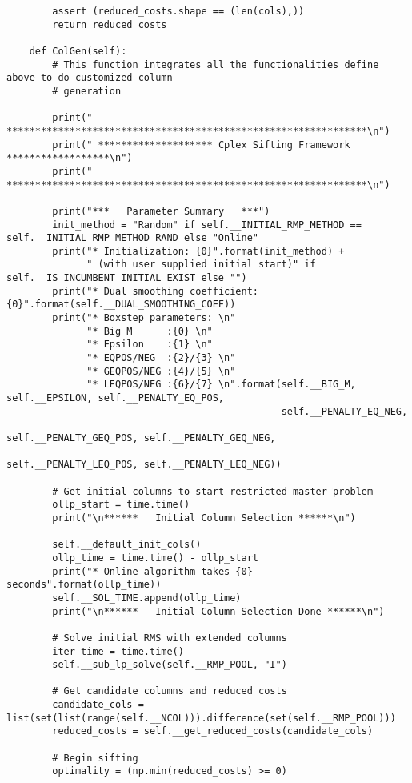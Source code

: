 \documentclass{article}
\begin{document}
\begin{lstlisting}
        assert (reduced_costs.shape == (len(cols),))
        return reduced_costs

    def ColGen(self):
        # This function integrates all the functionalities define above to do customized column 
        # generation

        print(" ***************************************************************\n")
        print(" ******************** Cplex Sifting Framework ******************\n")
        print(" ***************************************************************\n")

        print("***   Parameter Summary   ***")
        init_method = "Random" if self.__INITIAL_RMP_METHOD == self.__INITIAL_RMP_METHOD_RAND else "Online"
        print("* Initialization: {0}".format(init_method) +
              " (with user supplied initial start)" if self.__IS_INCUMBENT_INITIAL_EXIST else "")
        print("* Dual smoothing coefficient: {0}".format(self.__DUAL_SMOOTHING_COEF))
        print("* Boxstep parameters: \n"
              "* Big M      :{0} \n"
              "* Epsilon    :{1} \n"
              "* EQPOS/NEG  :{2}/{3} \n"
              "* GEQPOS/NEG :{4}/{5} \n"
              "* LEQPOS/NEG :{6}/{7} \n".format(self.__BIG_M, self.__EPSILON, self.__PENALTY_EQ_POS,
                                                self.__PENALTY_EQ_NEG, 
                                                self.__PENALTY_GEQ_POS, self.__PENALTY_GEQ_NEG,
                                                self.__PENALTY_LEQ_POS, self.__PENALTY_LEQ_NEG))

        # Get initial columns to start restricted master problem
        ollp_start = time.time()
        print("\n******   Initial Column Selection ******\n")

        self.__default_init_cols()
        ollp_time = time.time() - ollp_start
        print("* Online algorithm takes {0} seconds".format(ollp_time))
        self.__SOL_TIME.append(ollp_time)
        print("\n******   Initial Column Selection Done ******\n")

        # Solve initial RMS with extended columns
        iter_time = time.time()
        self.__sub_lp_solve(self.__RMP_POOL, "I")

        # Get candidate columns and reduced costs
        candidate_cols = list(set(list(range(self.__NCOL))).difference(set(self.__RMP_POOL)))
        reduced_costs = self.__get_reduced_costs(candidate_cols)

        # Begin sifting
        optimality = (np.min(reduced_costs) >= 0)


\end{lstlisting}
\end{document}
